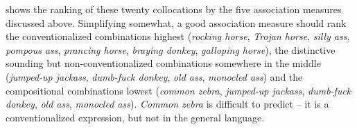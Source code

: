   shows the ranking of these twenty collocations  by the five association  measures  discussed above. Simplifying somewhat, a good association measure should rank the conventionalized  combinations highest (\textit{rocking horse}, \textit{Trojan horse}, \textit{silly ass}, \textit{pompous ass}, \textit{prancing horse}, \textit{braying donkey}, \textit{galloping horse}), the distinctive sounding but non\hyp{}conventionalized  combinations somewhere in the middle (\textit{jumped\hyp{}up jackass}, \textit{dumb\hyp{}fuck donkey}, \textit{old ass}, \textit{monocled ass}) and the compositional  combinations lowest (\textit{common zebra}, \textit{jumped\hyp{}up jackass}, \textit{dumb\hyp{}fuck donkey}, \textit{old ass}, \textit{monocled ass}). \textit{Common zebra} is difficult to predict -- it is a conventionalized  expression, but not in the general language.

